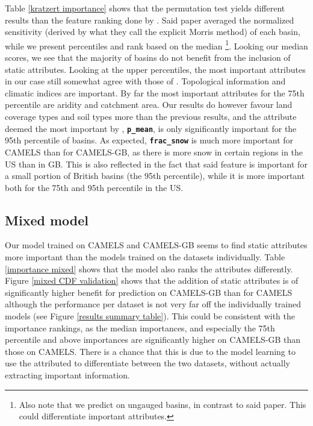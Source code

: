 Table \ref{kratzert importance} shows that the permutation test yields different 
results than the feature ranking done by \citet{lstm_second_paper}. Said paper 
averaged the normalized sensitivity (derived by what they call the explicit Morris 
method) of each basin, while we present percentiles and rank based on the median
\footnote{Also note that we predict on ungauged basins, in contrast to said paper. 
This could differentiate important attributes.}. 
Looking our median scores, we see that the majority of basins do not benefit 
from the inclusion of static attributes. Looking at the upper percentiles, the 
most important attributes in our case still somewhat agree with those of 
\citet{lstm_second_paper}. Topological information and climatic indices are important. 
By far the most important attributes for the 75th percentile are aridity and 
catchment area. Our results do however favour land coverage types and soil types 
more than the previous results, and the attribute deemed the most important by 
\citet{lstm_second_paper}, \textbf{\texttt{p\_mean}}, is only significantly important 
for the 95th percentile of basins. As expected, \textbf{\texttt{frac\_snow}} is 
much more important for CAMELS than for CAMELS-GB, as there is more snow 
in certain regions in the US than in GB. This is also reflected in the fact that 
said feature is important for a small portion of British basins (the 95th percentile), 
while it is more important both for the 75th and 95th percentile in the US. 

\subsection{Mixed model}
Our model trained on CAMELS and CAMELS-GB seems to find static attributes more important 
than the models trained on the datasets individually. Table \ref{importance mixed} 
shows that the model also ranks the attributes differently. Figure \ref{mixed CDF validation} 
shows that the addition of static attributes is of significantly higher benefit for 
prediction on CAMELS-GB than for CAMELS although the performance per dataset is not 
very far off the individually trained models (see Figure \ref{results summary table}).
This could be consistent with the importance rankings, as 
the median importances, and especially the 75th percentile and above importances are 
significantly higher on CAMELS-GB than those on CAMELS. There is a chance that this 
is due to the model learning to use the attributed to differentiate between the 
two datasets, without actually extracting important information.

